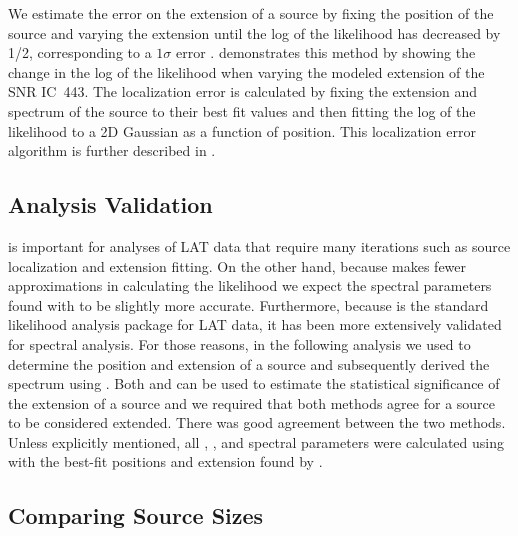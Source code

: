 We estimate the error on the extension of a source by fixing the
position of the source and varying the extension until the log of the
likelihood has decreased by 1/2, corresponding to a $1\sigma$ error
\citep{eadie_1971a_statistical-methods}.  
demonstrates this method by showing the change in the log of the
likelihood when varying the modeled extension of the SNR IC~443.
The localization error is calculated by fixing the extension and spectrum
of the source to their best fit values and then fitting the log of the
likelihood to a 2D Gaussian as a function of position. This localization
error algorithm is further described in \cite{nolan_2012_fermi-large}.

\subsection{\gtlike Analysis Validation}

\pointlike is important for analyses of LAT data that require many
iterations such as source localization and extension fitting.  On the
other hand, because \gtlike makes fewer approximations in calculating
the likelihood we expect the spectral parameters found with \gtlike to
be slightly more accurate.  Furthermore, because \gtlike is the standard
likelihood analysis package for LAT data, it has been more extensively
validated for spectral analysis.  For those reasons, in the following
analysis we used \pointlike to determine the position and extension of a
source and subsequently derived the spectrum using \gtlike. Both \gtlike
and \pointlike can be used to estimate the statistical significance of
the extension of a source and we required that both methods agree for a
source to be considered extended.  There was good agreement between the
two methods.  Unless explicitly mentioned, all \ts, \tsext, and spectral
parameters were calculated using \gtlike with the best-fit positions
and extension found by \pointlike.

\subsection{Comparing Source Sizes}

